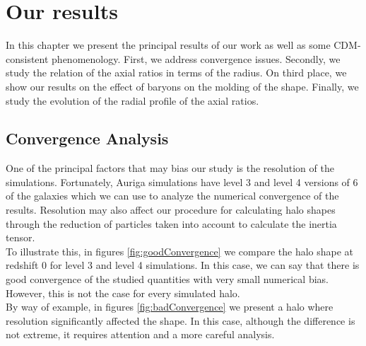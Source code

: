\chapter{Our results}

In this chapter we present the principal results of our work as well as some CDM-consistent phenomenology. First, we address convergence issues. Secondly, we study the relation of the axial ratios in terms of the radius. On third place, we show our results on the effect of baryons on the molding of the shape. Finally, we study the evolution of the radial profile of the axial ratios. 

\section{Convergence Analysis}
One of the principal factors that may bias our study is the resolution of the simulations. Fortunately, Auriga simulations have level 3 and level 4 versions of 6 of the galaxies which we can use to analyze the numerical convergence of the results. Resolution may also affect our procedure for calculating halo shapes through the reduction of particles taken into account to calculate the inertia tensor.\\

To illustrate this, in figures \ref{fig:goodConvergence} we compare the halo shape at redshift 0 for level 3 and level 4 simulations. In this case, we can say that there is good convergence of the studied quantities with very small numerical bias. However, this is not the case for every simulated halo.\\

 By way of example, in figures \ref{fig:badConvergence} we present a halo where resolution significantly affected the shape. In this case, although the difference is not extreme, it requires attention and a more careful analysis.\\

